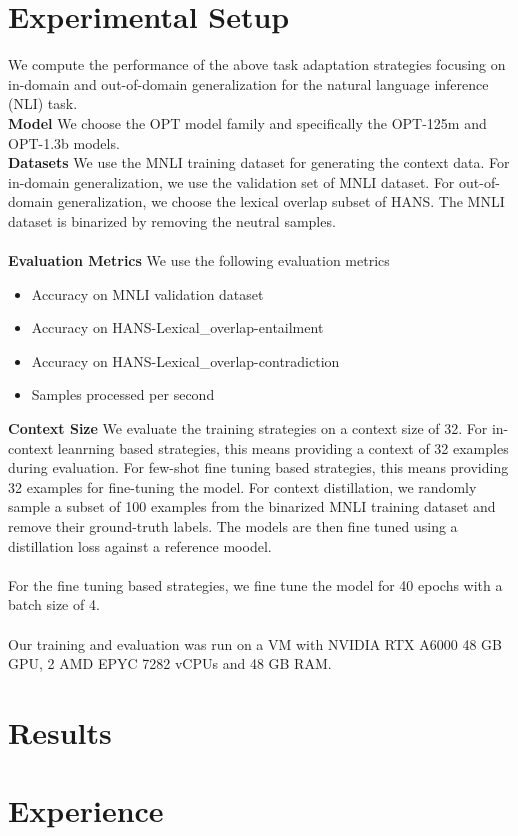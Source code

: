 \documentclass[10pt,twocolumn,letterpaper]{article}
\begin{document}
\section{Experimental Setup}
We compute the performance of the above task adaptation strategies focusing on in-domain and out-of-domain generalization for the natural language inference (NLI) task.\\
\textbf{Model} We choose the OPT model family and specifically the OPT-125m and OPT-1.3b models.\\
\textbf{Datasets} We use the MNLI training dataset for generating the context data. For in-domain generalization, we use the validation set of MNLI dataset. For out-of-domain generalization, we choose the lexical overlap subset of HANS. The MNLI dataset is binarized by removing the neutral samples.\\\\
\textbf{Evaluation Metrics} We use the following evaluation metrics
\begin{itemize}
    \item Accuracy on MNLI validation dataset
    \item Accuracy on HANS-Lexical\_overlap-entailment
    \item Accuracy on HANS-Lexical\_overlap-contradiction
    \item Samples processed per second
\end{itemize}
\textbf{Context Size} We evaluate the training strategies on a context size of 32. For in-context leanrning based strategies, this means providing a context of 32 examples during evaluation. For few-shot fine tuning based strategies, this means providing 32 examples for fine-tuning the model. For context distillation, we randomly sample a subset of 100 examples from the binarized MNLI training dataset and remove their ground-truth labels. The models are then fine tuned using a distillation loss against a reference moodel.\\\\
For the fine tuning based strategies, we fine tune the model for 40 epochs with a batch size of 4.\\\\
Our training and evaluation was run on a VM with NVIDIA RTX A6000 48 GB GPU, 2 AMD EPYC 7282 vCPUs and 48 GB RAM.


\section{Results}
\section{Experience}
\end{document}
